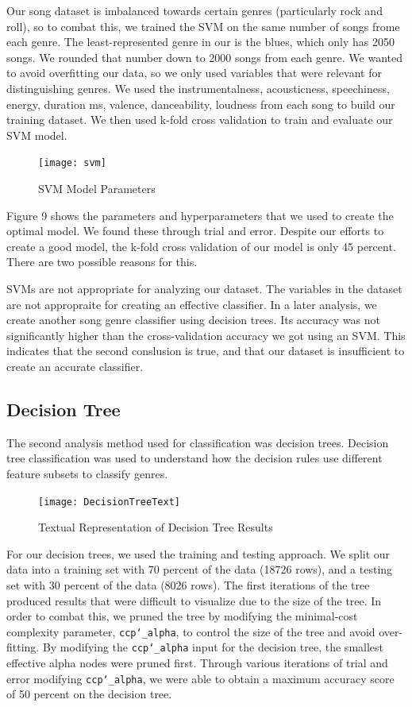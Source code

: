 \documentclass[11pt, a4paper, twocolumn]{article}
\begin{document}
Our song dataset is imbalanced towards certain genres (particularly rock and roll), so to combat this, we trained the SVM on the same number of songs frome each genre. The least-represented genre in our is the blues, which only has 2050 songs. We rounded that number down to 2000 songs from each genre. We wanted to avoid overfitting our data, so we only used variables that were relevant for distinguishing genres. We used the instrumentalness, acousticness, speechiness, energy, duration ms, valence, danceability, loudness from each song to build our training dataset. We then used k-fold cross validation to train and evaluate our SVM model.
\begin{figure}[htb!]
\centerline{\texttt{[image: svm]}}
\caption{SVM Model Parameters}
\end{figure}
Figure 9 shows the parameters and hyperparameters that we used to create the optimal model. We found these through trial and error. Despite our efforts to create a good model, the k-fold cross validation of our model is only 45 percent. There are two possible reasons for this.

SVMs are not appropriate for analyzing our dataset. The variables in the dataset are not appropraite for creating an effective classifier. In a later analysis, we create another song genre classifier using decision trees. Its accuracy was not significantly higher than the cross-validation accuracy we got using an SVM. This indicates that the second conslusion is true, and that our dataset is insufficient to create an accurate classifier.
\subsection{Decision Tree}
The second analysis method used for classification was decision trees. Decision tree classification was used to understand how the decision rules use different feature subsets to classify genres. 
\begin{figure}[htb!]
\centerline{\texttt{[image: DecisionTreeText]}}
\caption{Textual Representation of Decision Tree Results}
\end{figure}
For our decision trees, we used the training and testing approach. We split our data into a training set with 70 percent of the data (18726 rows),  and a testing set with 30 percent of the data (8026 rows). The first iterations of the tree produced results that were difficult to visualize due to the size of the tree. In order to combat this, we pruned the tree by modifying the minimal-cost complexity parameter, \texttt{ccp\char`_alpha}, to control the size of the tree and avoid over-fitting. By modifying the \texttt{ccp\char`_alpha} input for the decision tree, the smallest effective alpha nodes were pruned first. Through various iterations of trial and error modifying \texttt{ccp\char`_alpha}, we were able to obtain a maximum accuracy score of 50 percent on the decision tree. 
\end{document}
